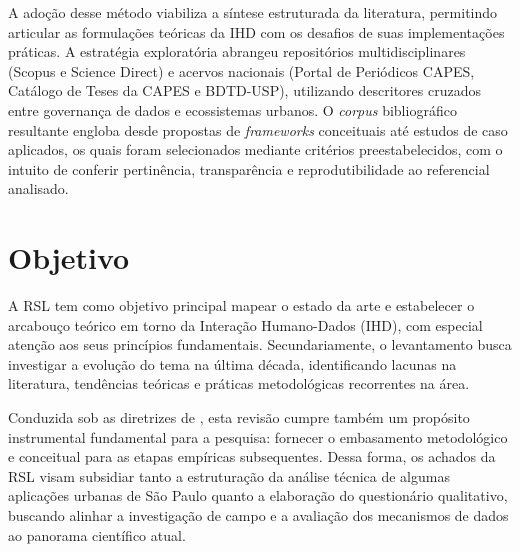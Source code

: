 \documentclass[
	12pt,				%
	oneside,			%
	a4paper,			%
	english,			%
	brazil				%
	]{abntex2ppgsi}
\begin{document}
    A adoção desse método viabiliza a síntese estruturada da literatura, permitindo articular as formulações teóricas da IHD com os desafios de suas implementações práticas. A estratégia exploratória abrangeu repositórios multidisciplinares (Scopus e Science Direct) e acervos nacionais (Portal de Periódicos CAPES, Catálogo de Teses da CAPES e BDTD-USP), utilizando descritores cruzados entre governança de dados e ecossistemas urbanos. O \textit{corpus} bibliográfico resultante engloba desde propostas de \textit{frameworks} conceituais até estudos de caso aplicados, os quais foram selecionados mediante critérios preestabelecidos, com o intuito de conferir pertinência, transparência e reprodutibilidade ao referencial analisado.
    
  

\section{Objetivo}

    A RSL tem como objetivo principal mapear o estado da arte e estabelecer o arcabouço teórico em torno da Interação Humano-Dados (IHD), com especial atenção aos seus princípios fundamentais. Secundariamente, o levantamento busca investigar a evolução do tema na última década, identificando lacunas na literatura, tendências teóricas e práticas metodológicas recorrentes na área.

    Conduzida sob as diretrizes de , esta revisão cumpre também um propósito instrumental fundamental para a pesquisa: fornecer o embasamento metodológico e conceitual para as etapas empíricas subsequentes. Dessa forma, os achados da RSL visam subsidiar tanto a estruturação da análise técnica de algumas aplicações urbanas de São Paulo quanto a elaboração do questionário qualitativo, buscando alinhar a investigação de campo e a avaliação dos mecanismos de dados ao panorama científico atual.


\end{document}
